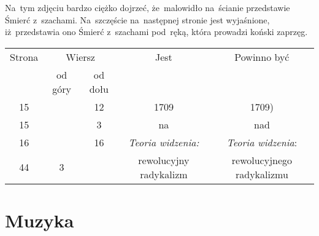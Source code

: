 \documentclass[a4paper,11pt]{article}
\begin{document}
\start {} Na~tym zdjęciu bardzo ciężko dojrzeć, że~malowidło
na~ścianie przedstawie Śmierć z~szachami. Na~szczęście na~następnej
stronie jest wyjaśnione, iż~przedstawia ono Śmierć z~szachami
pod~ręką, która prowadzi koński zaprzęg.

\vspace{\spaceFour}







\begin{center}

  \begin{tabular}{|c|c|c|c|c|}
    \hline
    Strona & \multicolumn{2}{c|}{Wiersz} & Jest
                              & Powinno być \\ \cline{2-3}
    & od góry & od dołu & & \\
    \hline
    15  & & 12 & 1709 & 1709) \\
    15  & &  3 & na & nad \\
    16  & & 16 & \textit{Teoria widzenia:} & \textit{Teoria widzenia}: \\
    44  &  3 & & rewolucyjny radykalizm & rewolucyjnego radykalizmu \\
    \hline
  \end{tabular}

\end{center}

\vspace{\spaceTwo}













\newpage

\section{Muzyka}

\vspace{\spaceTwo}
\end{document}
